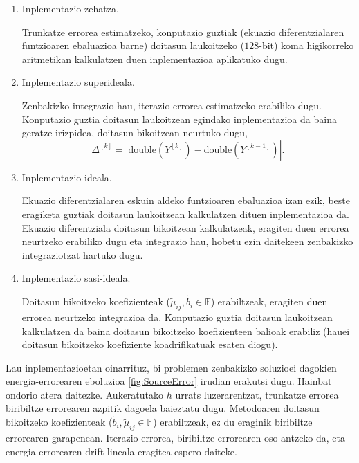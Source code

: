 \begin{enumerate}
\renewcommand{\theenumi}{\Alph{enumi}}

\item Inplementazio zehatza.

Trunkatze errorea estimatzeko, konputazio guztiak (ekuazio diferentzialaren funtzioaren ebaluazioa barne) doitasun laukoitzeko ($128$-bit) koma higikorreko aritmetikan kalkulatzen duen inplementazioa aplikatuko dugu. 


\item Inplementazio superideala.

Zenbakizko integrazio hau, iterazio errorea estimatzeko erabiliko dugu. Konputazio guztia doitasun laukoitzean egindako inplementazioa da baina geratze irizpidea, doitasun bikoitzean neurtuko dugu,
\begin{equation*}
\Delta^{[k]}=|\text{double}(Y^{[k]})-\text{double}(Y^{[k-1]})|.
\end{equation*}

\item Inplementazio ideala.

Ekuazio diferentzialaren eskuin aldeko funtzioaren ebaluazioa izan ezik, beste eragiketa guztiak doitasun laukoitzean kalkulatzen dituen inplementazioa da. Ekuazio diferentziala doitasun bikoitzean kalkulatzeak, eragiten duen errorea neurtzeko erabiliko dugu eta integrazio hau, hobetu ezin daitekeen zenbakizko integraziotzat hartuko dugu.  

\item Inplementazio sasi-ideala.

Doitasun bikoitzeko koefizienteak ($\tilde{\mu}_{ij},\tilde{b}_i \in \mathbb{F}$) erabiltzeak, eragiten duen errorea neurtzeko integrazioa da. Konputazio guztia doitasun laukoitzean kalkulatzen da baina doitasun bikoitzeko koefizienteen balioak erabiliz (hauei doitasun bikoitzeko koefiziente koadrifikatuak esaten diogu). 

\end{enumerate}

Lau inplementazioetan oinarrituz, bi problemen zenbakizko soluzioei dagokien energia-errorearen eboluzioa \ref{fig:SourceError} irudian erakutsi dugu. Hainbat ondorio atera daitezke. Aukeratutako $h$ urrats luzerarentzat, trunkatze errorea biribiltze errorearen azpitik dagoela baieztatu dugu. Metodoaren doitasun bikoitzeko koefizienteak ($\tilde{b}_i, \tilde{\mu}_{ij}\in \mathbb{F}$) erabiltzeak, ez du eraginik biribiltze errorearen garapenean.  Iterazio errorea, biribiltze errorearen oso antzeko da, eta energia errorearen drift lineala eragitea espero daiteke. 

